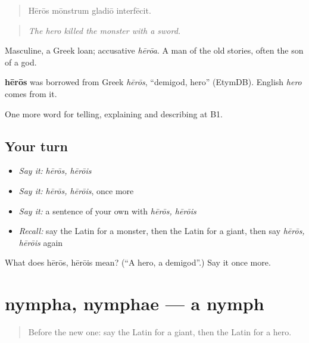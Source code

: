 \begin{quote}
Hērōs mōnstrum gladiō interfēcit.
\end{quote}

\begin{quote}
\emph{The hero killed the monster with a sword.}
\end{quote}

Masculine, a Greek loan; accusative \emph{hērōa}. A man of the old stories, often the son of a god.

\begin{cousinweb}
\textbf{hērōs} was borrowed from Greek \emph{hērōs}, \textquotedblleft{}demigod, hero\textquotedblright{} (EtymDB). English \emph{hero} comes from it.
\end{cousinweb}

\begin{grammarlens}[title={What you've built}]
One more word for telling, explaining and describing at B1.
\end{grammarlens}

\subsection*{Your turn}
\begin{itemize}
\raggedright
  \item \emph{Say it:} \emph{hērōs, hērōis}
  \item \emph{Say it:} \emph{hērōs, hērōis}, once more
  \item \emph{Say it:} a sentence of your own with \emph{hērōs, hērōis}
  \item \emph{Recall:} say the Latin for a monster, then the Latin for a giant, then say \emph{hērōs, hērōis} again
\end{itemize}

\begin{tcolorbox}[breakable,colback=teal!4,colframe=teal!35!black,title={Before you move on}]
What does hērōs, hērōis mean? (\textquotedblleft{}A hero, a demigod\textquotedblright{}.) Say it once more.
\end{tcolorbox}
\section[nympha, nymphae]{nympha, nymphae — a nymph}

\label{lesson:LA-C347-nympha}



\begin{quote}
Before the new one: say the Latin for a giant, then the Latin for a hero.
\end{quote}

